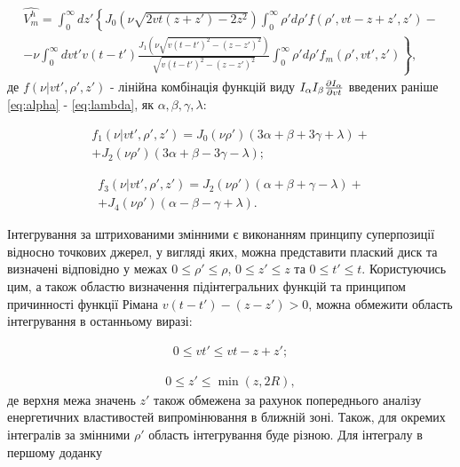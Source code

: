\begin{equation} \begin{aligned}
\hat{V_m^h} = \int_{0}^{\infty} dz'
\left\{ J_0 \left( \nu \sqrt{2 vt (z + z') - 2 z^2} \right) 
\int_{0}^{\infty} \rho' d \rho'
f (\rho',vt - z + z',z') - \right. \\ 
\left. - \nu \int_{0}^{\infty} dvt' v (t-t') 
\frac{J_1 \left( \nu \sqrt{v(t-t')^2 - (z-z')^2} \right)}
{\sqrt{v(t-t')^2 - (z-z')^2}} 
\int_{0}^{\infty} \rho' d\rho'
f_m (\rho',vt',z')  \right\},
\end{aligned} \end{equation}
%
де $ f ( \nu | vt', \rho', z') $ - лінійна комбінація функцій виду
$ I_\alpha I_\beta \frac{\partial I_\alpha}{\partial vt} $ введених раніше 
\eqref{eq:alpha} - \eqref{eq:lambda}, як $ \alpha, \beta, \gamma, \lambda $:

\begin{equation} \begin{aligned}
f_1 ( \nu | vt', \rho', z') = 
J_0 (\nu \rho') (3 \alpha + \beta + 3 \gamma + \lambda) + \\
+ J_2 (\nu \rho') (3 \alpha + \beta - 3 \gamma - \lambda);
\end{aligned} \end{equation}

\begin{equation} \begin{aligned}
f_3 ( \nu | vt', \rho', z') = 
J_2 (\nu \rho') (\alpha + \beta + \gamma - \lambda) + \\
+ J_4 (\nu \rho') (\alpha - \beta - \gamma + \lambda).
\end{aligned} \end{equation}

Інтегрування за штрихованими змінними є виконанням принципу суперпозиції 
відносно точкових джерел, у вигляді яких, можна представити плаский диск та
визначені відповідно у межах $ 0 \leq \rho' \leq \rho $,
$ 0 \leq z' \leq z $ та $ 0 \leq t' \leq t $. Користуючись цим, а також 
областю визначення підінтегральних функцій та принципом причинності функції 
Рімана $ v(t-t')-(z-z') > 0 $, можна обмежити область інтегрування в 
останньому виразі:

\begin{equation} \begin{aligned}
0 \leq vt' \leq vt - z + z';
\end{aligned} \end{equation}

\begin{equation} \begin{aligned}
0 \leq z' \leq \min(z,2R),
\end{aligned} \end{equation}
%
де верхня межа значень $ z' $ також обмежена за рахунок попереднього аналізу 
енергетичних властивостей випромінювання в ближній зоні. Також, для окремих 
інтегралів за змінними $ \rho' $ область інтегрування буде різною. Для 
інтегралу в першому доданку

